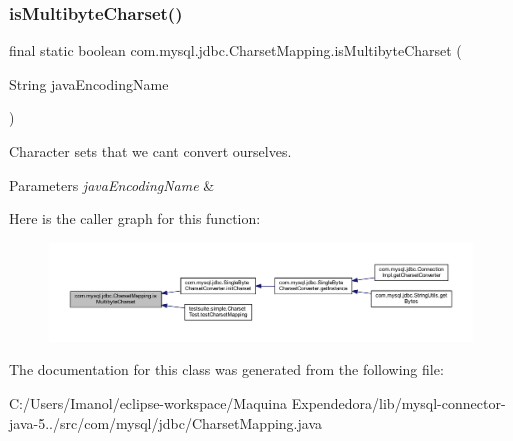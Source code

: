 \subsubsection{\texorpdfstring{is\+Multibyte\+Charset()}{isMultibyteCharset()}}
{\footnotesize\ttfamily final static boolean com.\+mysql.\+jdbc.\+Charset\+Mapping.\+is\+Multibyte\+Charset (\begin{DoxyParamCaption}\item[{String}]{java\+Encoding\+Name }\end{DoxyParamCaption})\hspace{0.3cm}{\ttfamily [static]}}

Character sets that we can\textquotesingle{}t convert ourselves.


\begin{DoxyParams}{Parameters}
{\em java\+Encoding\+Name} & \\
\hline
\end{DoxyParams}
Here is the caller graph for this function\+:\nopagebreak
\begin{figure}[H]
\begin{center}
\leavevmode
\includegraphics[width=350pt]{classcom_1_1mysql_1_1jdbc_1_1_charset_mapping_a975ea312dfd719facd25053d58848d76_icgraph}
\end{center}
\end{figure}


The documentation for this class was generated from the following file\+:\begin{DoxyCompactItemize}
\item 
C\+:/\+Users/\+Imanol/eclipse-\/workspace/\+Maquina Expendedora/lib/mysql-\/connector-\/java-\/5../src/com/mysql/jdbc/Charset\+Mapping.\+java\end{DoxyCompactItemize}
